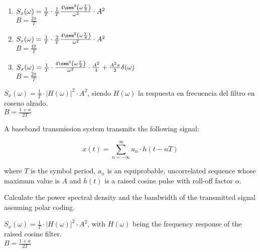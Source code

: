 \documentclass[es,boletin]{uah}
\begin{document}
{
	\begin{enumerate}
		\item $S_x(\omega) = \frac{1}{T} \cdot \frac{1}{T} \frac{4 \sen^2\left ( \omega \frac{T}{2}\right )}{\omega^2} \cdot A^2$ \\
				$B = \frac{2\pi}{T}$
		\item $S_x(\omega) = \frac{1}{T} \cdot \frac{2}{T} \frac{4 \sen^2\left ( \omega \frac{T}{4}\right )}{\omega^2} \cdot A^2$ \\
				$B = \frac{4\pi}{T}$
		\item $S_x(\omega) = \frac{1}{T} \cdot \frac{4 \sen^2\left ( \omega \frac{T}{2}\right )}{\omega^2} \cdot \frac{A^2}{4} + \frac{A^2 \pi}{2} \delta(\omega)$ \\
				$B = \frac{2\pi}{T}$
	\end{enumerate}
}


{
	$S_x(\omega) = \frac{1}{T} \cdot |H(\omega)|^2 \cdot A^2$, siendo $H(\omega)$ la respuesta en frecuencia del filtro en coseno alzado. \\
			$B = \frac{1+\alpha}{2T}$
}
{
	A baseband transmission system transmits the following signal:

	\begin{displaymath}
		x(t) = \sum_{n=-\infty}^{\infty} a_n \cdot h(t-nT)
	\end{displaymath}
	
	where $T$ is the symbol period, $a_n$ is an equiprobable, uncorrelated sequence whose maximum value is $A$ and $h(t)$ is a raised cosine pulse with roll-off factor $\alpha$. 
	
	Calculate the power spectral density and the bandwidth of the transmitted signal assuming polar coding.
	
}
{
	$S_x(\omega) = \frac{1}{T} \cdot |H(\omega)|^2 \cdot A^2$, with $H(\omega)$ being the frequency response of the raised cosine filter. \\
				$B = \frac{1+\alpha}{2T}$

}
\end{document}
